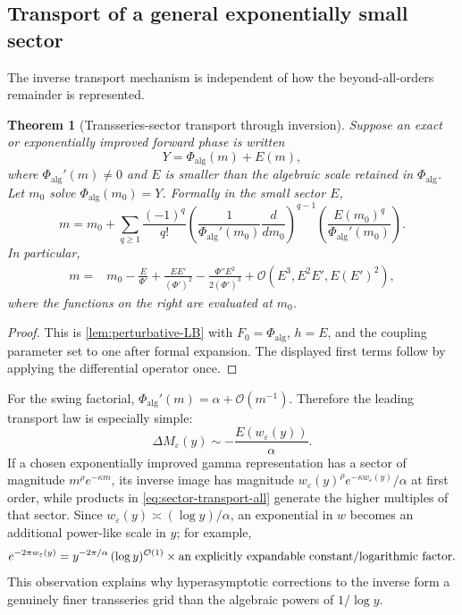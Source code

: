 \documentclass[11pt,a4paper]{article}
\theoremstyle{clean}
\newtheorem{theorem}{Theorem}[section]
\theoremstyle{definition}
\newcommand{\eps}{\varepsilon}
\newcommand{\al}{\alpha}
\newcommand{\OO}{\mathcal O}
\begin{document}
\subsection{Transport of a general exponentially small sector}

The inverse transport mechanism is independent of how the beyond-all-orders remainder is represented.

\begin{theorem}[Transseries-sector transport through inversion]
\label{thm:sector-transport}
Suppose an exact or exponentially improved forward phase is written
\begin{equation}
 Y=\Phi_{\mathrm{alg}}(m)+E(m),
 \label{eq:sector-forward}
\end{equation}
where \(\Phi_{\mathrm{alg}}'(m)\ne0\) and \(E\) is smaller than the algebraic scale retained in \(\Phi_{\mathrm{alg}}\).  Let \(m_0\) solve \(\Phi_{\mathrm{alg}}(m_0)=Y\).  Formally in the small sector \(E\),
\begin{equation}
 m=m_0+\sum_{q\ge1}\frac{(-1)^q}{q!}
 \left(\frac1{\Phi_{\mathrm{alg}}'(m_0)}\frac{d}{dm_0}\right)^{q-1}
 \left(\frac{E(m_0)^q}{\Phi_{\mathrm{alg}}'(m_0)}\right).
 \label{eq:sector-transport-all}
\end{equation}
In particular,
\begin{align}
 m={}&m_0-\frac{E}{\Phi'}
 +\frac{EE'}{(\Phi')^2}
 -\frac{\Phi''E^2}{2(\Phi')^3}
 +\OO(E^3,E^2E',E(E')^2),
 \label{eq:sector-transport-first}
\end{align}
where the functions on the right are evaluated at \(m_0\).
\end{theorem}

\begin{proof}
This is \cref{lem:perturbative-LB} with \(F_0=\Phi_{\mathrm{alg}}\), \(h=E\), and the coupling parameter set to one after formal expansion.  The displayed first terms follow by applying the differential operator once.
\end{proof}

For the swing factorial, \(\Phi_{\mathrm{alg}}'(m)=\al+\OO(m^{-1})\).  Therefore the leading transport law is especially simple:
\begin{equation}
 \Delta M_\eps(y)\sim-\frac{E(w_\eps(y))}{\al}.
 \label{eq:swing-sector-leading}
\end{equation}
If a chosen exponentially improved gamma representation has a sector of magnitude \(m^\rho e^{-\kappa m}\), its inverse image has magnitude \(w_\eps(y)^\rho e^{-\kappa w_\eps(y)}/\al\) at first order, while products in \cref{eq:sector-transport-all} generate the higher multiples of that sector.  Since \(w_\eps(y)\asymp(\log y)/\al\), an exponential in \(w\) becomes an additional power-like scale in \(y\); for example,
\begin{equation}
 e^{-2\pi w_\eps(y)}
 =y^{-2\pi/\al}\,(\log y)^{\OO(1)}
 \times\hbox{an explicitly expandable constant/logarithmic factor}.
 \label{eq:exp-to-y-power}
\end{equation}
This observation explains why hyperasymptotic corrections to the inverse form a genuinely finer transseries grid than the algebraic powers of \(1/\log y\).
\end{document}
